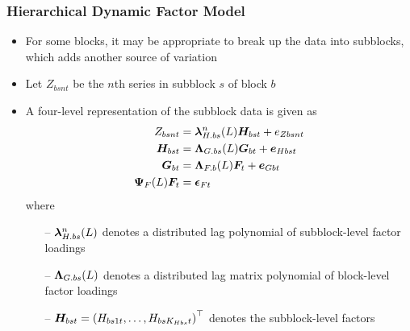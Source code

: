 \documentclass[10pt, compress, notheorems, aspectratio=169]{beamer}
\let\originalleft\left
\let\originalright\right
\renewcommand{\left}{\mathopen{}\mathclose \bgroup \originalleft}
\renewcommand{\right}{\aftergroup \egroup \originalright}
\begin{document}
\begin{frame}
	\frametitle{Hierarchical Dynamic Factor Model}
	\begin{itemize}
		\item For some blocks, it may be appropriate to break up the data into subblocks, which adds another source of variation
		\item Let $Z_{bsnt}$ be the $n$th series in subblock $s$ of block $b$
		\item A four-level representation of the subblock data is given as
			\begin{align}
				Z_{bsnt} &= {\bm \lambda}^n_{H.bs} \left( L \right) {\bm H}_{bst} + e_{Zbsnt} \\
				{\bm H}_{bst} &= {\bm \Lambda}_{G.bs} \left( L \right) {\bm G}_{bt} + {\bm e}_{Hbst} \\
				{\bm G}_{bt} &= {\bm \Lambda}_{F.b} \left( L \right) {\bm F}_t + {\bm e}_{Gbt} \\
				{\bm \Psi}_F \left( L \right) {\bm F}_t &= {\bm \epsilon}_{Ft}
			\end{align}	
			where
			\begin{itemize}
				\item[--] ${\bm \lambda}^n_{H.bs} \left( L \right)$ denotes a distributed lag polynomial of subblock-level factor loadings
				\item[--] ${\bm \Lambda}_{G.bs} \left( L \right)$ denotes a distributed lag matrix polynomial of block-level factor loadings
				\item[--] ${\bm H}_{bst} = \left( H_{bs1t}, \ldots, H_{bsK_{Hbs}t} \right)^{\top}$ denotes the subblock-level factors
			\end{itemize}

	\end{itemize}
\end{frame}
\end{document}

